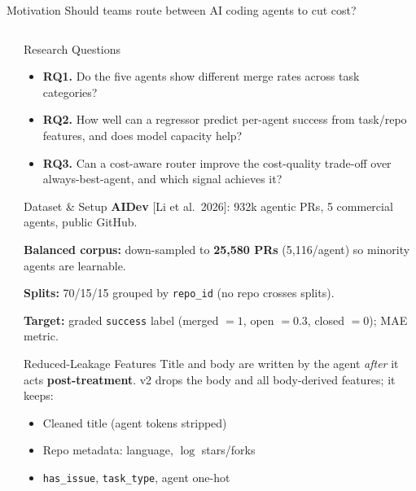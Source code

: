\documentclass[final, xcolor={table,dvipsnames},t]{beamer}
\newlength{\sepwidthA}
\newlength{\colwidthA}
\newcommand{\separatorcolumnA}{\begin{column}{\sepwidthA}\end{column}}
\newlength{\sepwidthB}
\newlength{\colwidthB}
\newcommand{\separatorcolumnB}{\begin{column}{\sepwidthB}\end{column}}
\begin{document}
\begin{frame}[t]
\begin{columns}[t]
\begin{column}{\colwidthA}
\begin{alertblock}{Motivation \textemdash{} Should teams route between AI coding agents to cut cost?}
        \end{alertblock}
    \end{column}
    \separatorcolumnA
\end{columns}

\begin{columns}[t]
\separatorcolumnB
\begin{column}[T]{\colwidthB}

    \begin{block}{Research Questions}
    \begin{itemize}\itemsep
        \item \textbf{RQ1.} Do the five agents show different merge rates across task categories?
        \item \textbf{RQ2.} How well can a regressor predict per-agent success from task/repo features, and does model capacity help?
        \item \textbf{RQ3.} Can a cost-aware router improve the cost-quality trade-off over always-best-agent, and which signal achieves it?
    \end{itemize}
    \end{block}
    

    \begin{block}{Dataset \& Setup}
    \textbf{AIDev} [Li et al.\ 2026]: 932k agentic PRs, 5 commercial agents, public GitHub.

    \textbf{Balanced corpus:} down-sampled to \textbf{25,580 PRs} (5,116/agent) so minority agents are learnable.

    \textbf{Splits:} 70/15/15 grouped by \texttt{repo\_id} (no repo crosses splits).

    \textbf{Target:} graded \texttt{success} label (merged $=1$, open $=0.3$, closed $=0$); MAE metric.
    \end{block}


    \begin{block}{Reduced-Leakage Features}
    Title and body are written by the agent \emph{after} it acts \textemdash{} \textbf{post-treatment}. v2 drops the body and all body-derived features; it keeps:
    \begin{itemize}
        \item Cleaned title (agent tokens stripped)
        \item Repo metadata: language, \(\log\) stars/forks
        \item \texttt{has\_issue}, \texttt{task\_type}, agent one-hot
    \end{itemize}
    \end{block}



\end{column}
\end{columns}
\end{frame}
\end{document}
